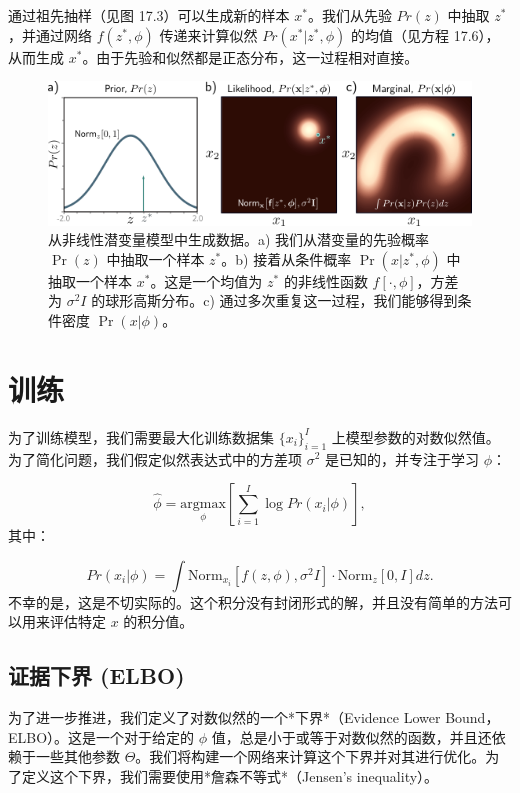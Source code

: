 通过祖先抽样（见图 17.3）可以生成新的样本 \(x^*\)。我们从先验 \(Pr(z)\) 中抽取 \(z^*\)，并通过网络 \(f(z^*, \phi)\) 传递来计算似然 \(Pr(x^*|z^*, \phi)\) 的均值（见方程 17.6），从而生成 \(x^*\)。由于先验和似然都是正态分布，这一过程相对直接。

\begin{figure}[ht!]
\centering
\includegraphics[width=0.7\linewidth]{png/chapter17/VAENonLinearLVMGen.png}
\caption{从非线性潜变量模型中生成数据。a) 我们从潜变量的先验概率 \( \Pr(z) \) 中抽取一个样本 \( z^* \)。b) 接着从条件概率 \( \Pr(x|z^*, \phi) \) 中抽取一个样本 \( x^* \)。这是一个均值为 \( z^* \) 的非线性函数 \( f[\cdot, \phi] \)，方差为 \( \sigma^2 I \) 的球形高斯分布。c) 通过多次重复这一过程，我们能够得到条件密度 \( \Pr(x|\phi) \)。}
\end{figure}


\section{训练}

为了训练模型，我们需要最大化训练数据集 \(\{x_i\}_{i=1}^I\) 上模型参数的对数似然值。为了简化问题，我们假定似然表达式中的方差项 \(\sigma^2\) 是已知的，并专注于学习 \(\phi\)：

\begin{equation}
\hat{\phi} = \underset{\phi}{\mathrm{argmax}} \left[ \sum_{i=1}^I \log Pr(x_i|\phi) \right], 
\end{equation}
其中：

\begin{equation}
Pr(x_i|\phi) = \int \text{Norm}_{x_i} \left[ f(z, \phi), \sigma^2 I \right] \cdot \text{Norm}_z [0, I] dz. 
\end{equation}
不幸的是，这是不切实际的。这个积分没有封闭形式的解，并且没有简单的方法可以用来评估特定 \(x\) 的积分值。

\subsection{证据下界 (ELBO)}

为了进一步推进，我们定义了对数似然的一个*下界*（Evidence Lower Bound，ELBO）。这是一个对于给定的 \(\phi\) 值，总是小于或等于对数似然的函数，并且还依赖于一些其他参数 \(\Theta\)。我们将构建一个网络来计算这个下界并对其进行优化。为了定义这个下界，我们需要使用*詹森不等式*（Jensen's inequality）。

